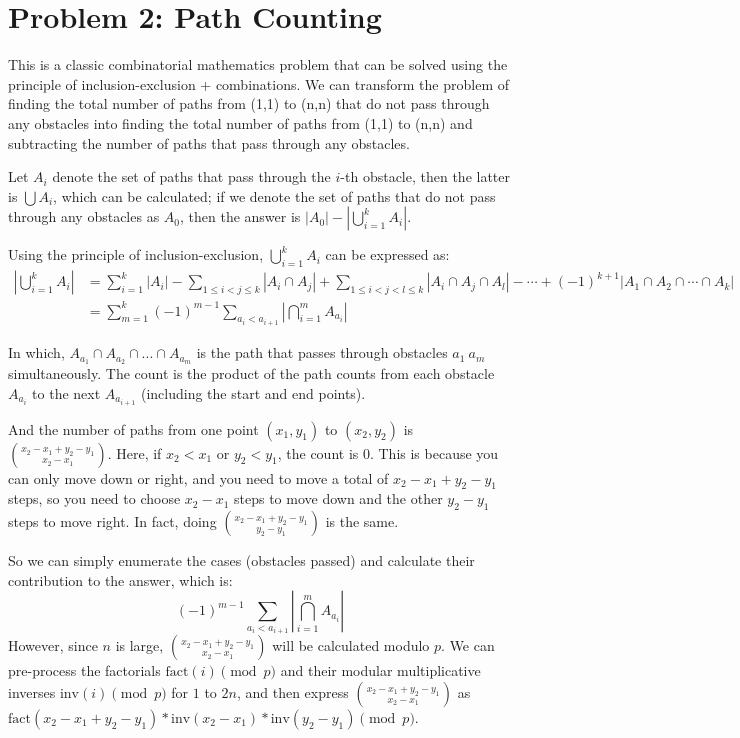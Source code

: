 \documentclass[11pt, a4paper, oneside]{memoir}
\begin{document}
\chapter{Problem 2: Path Counting}
This is a classic combinatorial mathematics problem that can be solved using the principle of
inclusion-exclusion + combinations. We can transform the problem of finding the total number of paths from (1,1) to (n,n)
that do not pass through any obstacles into finding the total number of paths from (1,1) to (n,n)
and subtracting the number of paths that pass through any obstacles.

Let $A_i$ denote the set of paths that pass through the $i$-th obstacle, then the latter is $\bigcup A_i$, which can be calculated;
if we denote the set of paths that do not pass through any obstacles as $A_0$,
then the answer is $|A_0|-|\bigcup_{i=1}^{k} A_i|$.

Using the principle of inclusion-exclusion, $\bigcup_{i=1}^{k} A_i$ can be expressed as:
\begin{align*}
  \left|\bigcup_{i=1}^{k} A_i\right| & = \sum_{i=1}^{k} |A_i| - \sum_{1 \le i < j \le k} |A_i \cap A_j| + \sum_{1 \le i < j < l \le k} |A_i \cap A_j \cap A_l| - \cdots + (-1)^{k+1} |A_1 \cap A_2 \cap \cdots \cap A_k| \\
                                     & = \sum_{m=1}^{k}\left(-1\right)^{m-1}\sum_{a_i<a_{i+1}}\left| \bigcap_{i=1}^{m} A_{a_i} \right|
\end{align*}

In which, $A_{a_1}\cap A_{a_2}\cap ...\cap A_{a_m}$ is the path that passes through obstacles $a_1~a_m$ simultaneously.
The count is the product of the path counts from each obstacle $A_{a_i}$ to the next $A_{a_{i+1}}$ (including the start and end points).

And the number of paths from one point $(x_1, y_1)$ to $(x_2, y_2)$ is $\binom{x_2-x_1+y_2-y_1}{x_2-x_1}$.
Here, if $x_2<x_1$ or $y_2<y_1$, the count is 0. This is because you can only move down or right,
and you need to move a total of $x_2-x_1+y_2-y_1$ steps, so you need to choose $x_2-x_1$ steps to move down
and the other $y_2-y_1$ steps to move right. In fact, doing $\binom{x_2-x_1+y_2-y_1}{y_2-y_1}$ is the same.

So we can simply enumerate the cases (obstacles passed) and calculate their contribution to the answer, which is:
\[ \left(-1\right)^{m-1}\sum_{a_i<a_{i+1}}\left| \bigcap_{i=1}^{m} A_{a_i} \right| \]
However, since $n$ is large, $\binom{x_2-x_1+y_2-y_1}{x_2-x_1}$ will be calculated modulo $p$.
We can pre-process the factorials $\text{fact}(i) \pmod{p}$ and their modular multiplicative inverses $\text{inv}(i) \pmod{p}$ for $1$ to $2n$,
and then express $\binom{x_2-x_1+y_2-y_1}{x_2-x_1}$ as $\text{fact}(x_2-x_1+y_2-y_1)*\text{inv}(x_2-x_1)*\text{inv}(y_2-y_1) \pmod{p}$.
\end{document}
